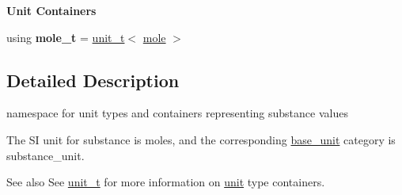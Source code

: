 \begin{Indent}{\bf Unit Containers}\par
{\em \label{namespaceunits_1_1substance_substanceContainers}%
\hypertarget{namespaceunits_1_1substance_substanceContainers}{}%
}\begin{DoxyCompactItemize}
\item 
\hypertarget{namespaceunits_1_1substance_a2d3efabdc304c82e9afbe08e25a5af65}{}using {\bfseries mole\+\_\+t} = \hyperlink{classunits_1_1unit__t}{unit\+\_\+t}$<$ \hyperlink{structunits_1_1unit}{mole} $>$\label{namespaceunits_1_1substance_a2d3efabdc304c82e9afbe08e25a5af65}

\end{DoxyCompactItemize}
\end{Indent}


\subsection{Detailed Description}
namespace for unit types and containers representing substance values 

The S\+I unit for substance is {\ttfamily moles}, and the corresponding {\ttfamily \hyperlink{structunits_1_1base__unit}{base\+\_\+unit}} category is {\ttfamily substance\+\_\+unit}. \begin{DoxySeeAlso}{See also}
See \hyperlink{classunits_1_1unit__t}{unit\+\_\+t} for more information on \hyperlink{structunits_1_1unit}{unit} type containers. 
\end{DoxySeeAlso}
